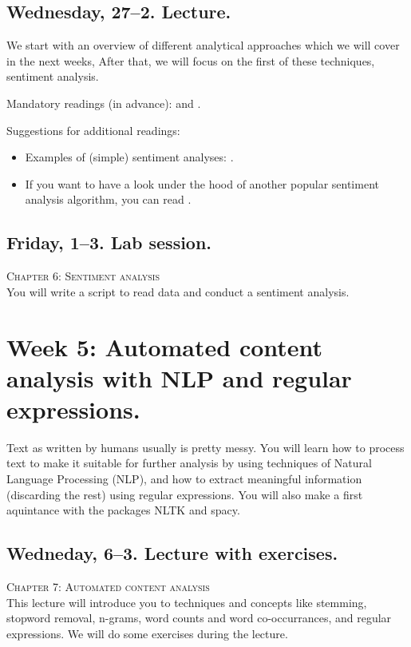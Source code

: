 \documentclass[a4paper,10pt]{report}
\begin{document}
\subsection*{Wednesday, 27--2. Lecture.}
We start with an overview of different analytical approaches which we will cover in the next weeks, After that, we will focus on the first of these techniques, sentiment analysis.

Mandatory readings (in advance): \cite{GonzalezBailon2015} and \cite{Hutto2014}.

Suggestions for additional readings:
\begin{itemize}
	\item Examples of (simple) sentiment analyses: \cite{Huang2007,Pestian2012, Mostafa2013}. 
	\item If you want to have a look under the hood of another popular sentiment analysis algorithm, you can read \cite{Thelwall2012}.
\end{itemize}




\subsection*{Friday, 1--3. Lab session.}
\textsc{ Chapter 6: Sentiment analysis}\\
You will write a script to read data and conduct a sentiment analysis.






\section*{Week 5: Automated content analysis with NLP and regular expressions.}
Text as written by humans usually is pretty messy. You will learn how to process text to make it suitable for further analysis by using techniques of Natural Language Processing (NLP), and how to extract meaningful information (discarding the rest) using regular expressions. You will also make a first aquintance with the packages NLTK and spacy.




\subsection*{Wedneday, 6--3. Lecture with exercises.}
\textsc{ Chapter 7: Automated content analysis}\\
This lecture will introduce you to techniques and concepts like stemming, stopword removal, n-grams, word counts and word co-occurrances, and regular expressions. We will do some exercises during the lecture.
\end{document}
